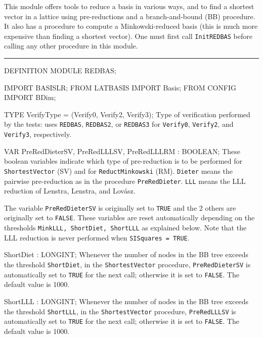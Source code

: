 
This module offers tools to reduce a basis in various ways,
and to find a shortest vector in a lattice
using pre-reductions and a branch-and-bound (BB) procedure.
It also has a procedure to compute a Minkowski-reduced basis
(this is much more expensive than finding a shortest vector).
One must first call {\tt InitREDBAS} before calling any other procedure
in this module.

\bigskip\hrule
\code

DEFINITION MODULE REDBAS;

IMPORT BASISLR;
FROM LATBASIS IMPORT Basis;
FROM CONFIG   IMPORT BDim;

TYPE
   VerifyType  = (Verify0, Verify2, Verify3);
\endcode
 \tabb Type of verification performed by the tests:
    uses {\tt REDBAS},  {\tt REDBAS2}, or {\tt REDBAS3}
    for {\tt Verify0}, {\tt Verify2}, and {\tt Verify3},
   respectively.
 \endtabb
\code


VAR
   PreRedDieterSV, PreRedLLLSV, PreRedLLLRM : BOOLEAN;
\endcode
  \tabb  These boolean variables indicate which type of pre-reduction 
   is to be performed for {\tt ShortestVector} (SV) and for 
   {\tt ReductMinkowski} (RM).
   {\tt Dieter} means the pairwise pre-reduction as in the procedure
   {\tt PreRedDieter}.  
   {\tt LLL} means the LLL reduction of Lenstra, Lenstra, and Lov\'asz.

   The variable {\tt PreRedDieterSV} is originally set to {\tt TRUE}
   and the 2 others are originally set to {\tt FALSE}.
   These variables are reset automatically depending on the thresholds 
   {\tt MinkLLL, ShortDiet, ShortLLL} as explained below.
   Note that the LLL reduction is never performed when {\tt SISquares = TRUE}.
 \endtabb
\code

   ShortDiet : LONGINT;
\endcode
 \tabb
   Whenever the number of nodes in the BB tree exceeds the threshold 
   {\tt ShortDiet}, in the {\tt ShortestVector} procedure, {\tt PreRedDieterSV}
   is automatically set to {\tt TRUE} for the next call; 
   otherwise it is set to {\tt FALSE}.
   The default value is 1000.
 \endtabb
\code

   ShortLLL : LONGINT;
\endcode
 \tabb 
   Whenever the number of nodes in the BB tree exceeds the threshold 
   {\tt ShortLLL}, in the {\tt ShortestVector} 
   procedure, {\tt PreRedLLLSV}
   is automatically set to {\tt TRUE} for the next call; 
   otherwise it is set to {\tt FALSE}.
   The default value is 1000.
  \endtabb
\code

